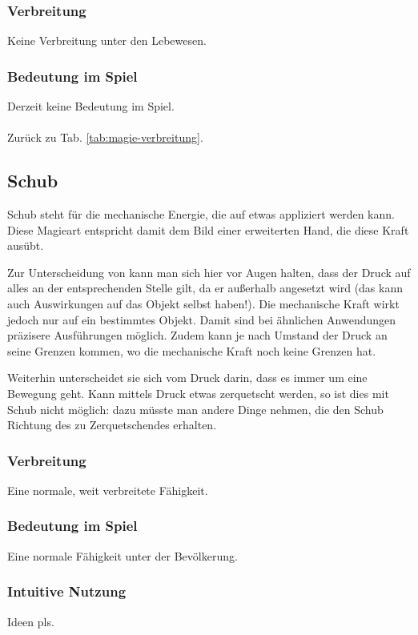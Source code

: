 \subsubsection{Verbreitung}
Keine Verbreitung unter den Lebewesen.

\subsubsection{Bedeutung im Spiel}
Derzeit keine Bedeutung im Spiel.
\\ \\
Zurück zu Tab. \ref{tab:magie-verbreitung}.



\subsection{Schub}\label{magie:schub}
Schub steht für die mechanische Energie, die auf etwas appliziert werden kann.
Diese Magieart entspricht damit dem Bild einer erweiterten Hand, die diese Kraft ausübt.


Zur Unterscheidung von  kann man sich hier vor Augen halten, dass der Druck auf alles an der entsprechenden Stelle gilt, da er außerhalb angesetzt wird (das kann auch Auswirkungen auf das Objekt selbst haben!). 
Die mechanische Kraft wirkt jedoch nur auf ein bestimmtes Objekt.
Damit sind bei ähnlichen Anwendungen präzisere Ausführungen möglich.
Zudem kann je nach Umstand der Druck an seine Grenzen kommen, wo die mechanische Kraft noch keine Grenzen hat.

Weiterhin unterscheidet sie sich vom Druck darin, dass es immer um eine Bewegung geht.
Kann mittels Druck etwas zerquetscht werden, so ist dies mit Schub nicht möglich: dazu müsste man andere Dinge nehmen, die den Schub Richtung des zu Zerquetschendes erhalten.

\subsubsection{Verbreitung}
Eine normale, weit verbreitete Fähigkeit.

\subsubsection{Bedeutung im Spiel}
Eine normale Fähigkeit unter der Bevölkerung.

\subsubsection{Intuitive Nutzung}
Ideen pls.

